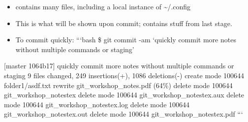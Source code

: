 \documentclass[10pt,]{article}
\newenvironment{Shaded}{}{}
\newcommand{\KeywordTok}[1]{\textcolor[rgb]{0.00,0.44,0.13}{\textbf{{#1}}}}
\newcommand{\CommentTok}[1]{\textcolor[rgb]{0.38,0.63,0.69}{\textit{{#1}}}}
\newcommand{\NormalTok}[1]{{#1}}
\providecommand{\tightlist}{%
  \setlength{\itemsep}{0pt}\setlength{\parskip}{0pt}}
\begin{document}
\begin{itemize}
\tightlist
\item
  contains many files, including a local instance of
  \textasciitilde{}/.config
\end{itemize}

\begin{Shaded}
\end{Shaded}

\begin{itemize}
\tightlist
\item
  This is what will be shown upon commit; contains stuff from last
  stage.
\end{itemize}

\begin{Shaded}
\end{Shaded}

\begin{itemize}
\tightlist
\item
  To commit quickly: ```bash \$ git commit -am `quickly commit more
  notes without multiple commands or staging'
\end{itemize}

{[}master 1064b17{]} quickly commit more notes without multiple commands
or staging 9 files changed, 249 insertions(+), 1086 deletions(-) create
mode 100644 folder1/asdf.txt rewrite git\_workshop\_notes.pdf (64\%)
delete mode 100644 git\_workshop\_notestex delete mode 100644
git\_workshop\_notestex.aux delete mode 100644
git\_workshop\_notestex.log delete mode 100644
git\_workshop\_notestex.out delete mode 100644
git\_workshop\_notestex.pdf ```
\end{document}
